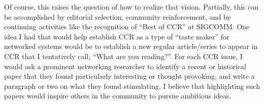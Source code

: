 \documentclass[11pt]{article}
\begin{document}
Of course, this raises the question of how to realize that vision. Partially, this can be accomplished by editorial selection, community reinforcement, and by continuing activities like the recognition of “Best of CCR” at SIGCOMM. One idea I had that would help establish CCR as a type of  “taste maker” for networked systems would be  to establish a new regular article/series to appear in CCR that I tentatively call, “What are you reading?”. For each CCR issue, I would ask a prominent networking researcher to identify a recent or historical paper that they found particularly interesting or thought provoking, and write a paragraph or two on what they found stimulating. I believe that highlighting such papers would inspire others in the community to pursue ambitious ideas.
\end{document}
